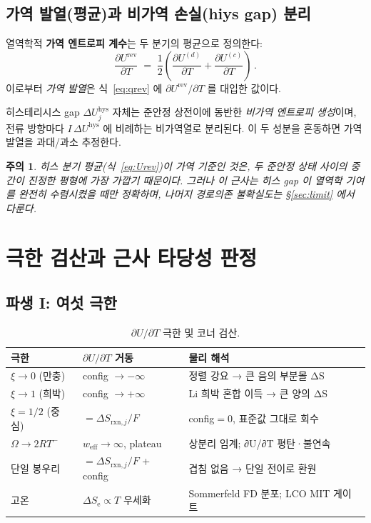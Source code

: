 \documentclass[11pt,a4paper]{article}
\newtheorem*{warnbox}{주의}
\newcommand{\rxn}{\mathrm{rxn}}
\newcommand{\rev}{\mathrm{rev}}
\newcommand{\elec}{\mathrm{e}}
\newcommand{\eff}{\mathrm{eff}}
\newcommand{\hys}{\mathrm{hys}}
\begin{document}
\subsection{가역 발열(평균)과 비가역 손실(hiys gap) 분리}

열역학적 \textbf{가역 엔트로피 계수}는 두 분기의 평균으로 정의한다:
\begin{equation}
  \frac{\partial U^\rev}{\partial T} \;=\;
  \frac12\left(\frac{\partial U^{(d)}}{\partial T}+\frac{\partial U^{(c)}}{\partial T}\right)\,.
  \label{eq:Urev}
\end{equation}
이로부터 \emph{가역 발열}은 식~\eqref{eq:qrev} 에 $\partial U^\rev/\partial T$ 를 대입한 값이다.

히스테리시스 gap $\Delta U_j^\hys$ 자체는 준안정 상전이에 동반한 \emph{비가역 엔트로피 생성}이며,
전류 방향마다 $I\,\Delta U^\hys$ 에 비례하는 비가역열로 분리된다. 이 두 성분을 혼동하면
가역 발열을 과대/과소 추정한다.

\begin{warnbox}
히스 분기 평균(식~\eqref{eq:Urev})이 \emph{가역} 기준인 것은, 두 준안정 상태
사이의 중간이 진정한 평형에 가장 가깝기 때문이다. 그러나 이 근사는 히스 gap 이
열역학 기여를 완전히 수렴시켰을 때만 정확하며, 나머지 경로의존 불확실도는
\S\ref{sec:limit} 에서 다룬다.
\end{warnbox}

\section{극한 검산과 근사 타당성 판정}\label{sec:limits}

\subsection{파생 I: 여섯 극한}

\begin{table}[h]
\centering\small
\renewcommand{\arraystretch}{1.25}
\caption{$\partial U/\partial T$ 극한 및 코너 검산.}
\label{tab:limits}
\begin{tabular}{l l l}
\toprule
극한 & $\partial U/\partial T$ 거동 & 물리 해석 \\
\midrule
$\xi\to0$ (만충) & config $\to-\infty$ & 정렬 강요 → 큰 음의 부분몰 ΔS \\
$\xi\to1$ (희박) & config $\to+\infty$ & Li 희박 혼합 이득 → 큰 양의 ΔS \\
$\xi=1/2$ (중심) & $=\Delta S_{\rxn,j}/F$ & config$=0$, 표준값 그대로 회수 \\
$\Omega\to2RT^-$ & $w_\eff\to\infty$, plateau & 상분리 임계; ∂U/∂T 평탄·불연속 \\
단일 봉우리 & $=\Delta S_{\rxn,j}/F$ + config & 겹침 없음 → 단일 전이로 환원 \\
고온 & $\Delta S_\elec\propto T$ 우세화 & Sommerfeld FD 분포; LCO MIT 게이트 \\
\bottomrule
\end{tabular}
\end{table}
\end{document}
